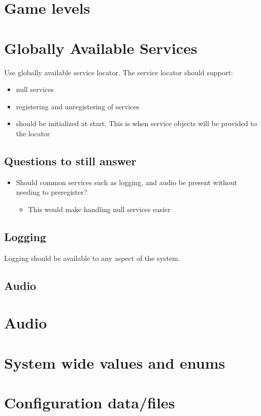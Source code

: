 \documentclass[12pt]{article}
\begin{document}
\section{	Game levels}

\section{ Globally Available Services}
Use globally available service locator.  The service locator should support:
\begin{itemize}
	\item null services
	\item registering and unregistering of services
	\item should be initialized at start.  This is when service objects will be provided to the locator
\end{itemize}

\subsection{Questions to still answer}
\begin{itemize}
	\item Should common services such as logging, and audio be present without needing to preregister?
	\begin{itemize}
		\item This would make handling null services easier
	\end{itemize}
\end{itemize}

\subsection{ Logging }
Logging should be available to any aspect of the system. 
\subsection{ Audio } 

\section{ Audio }

\section{	System wide values and enums}

\section{	Configuration data/files}
\end{document}
